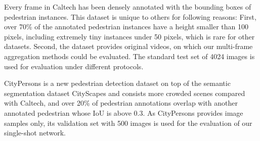 \documentclass[runningheads]{llncs}
\begin{document}
Every frame in Caltech has been densely annotated with the bounding boxes of pedestrian instances. This dataset is unique to others for following reasons: First, over 70\% of the annotated pedestrian instances have a height smaller than 100 pixels, including extremely tiny instances under 50 pixels, which is rare for other datasets. Second, the dataset provides original videos, on which our multi-frame aggregation methods could be evaluated. The standard test set of 4024 images is used for evaluation under different protocols.

CityPersons is a new pedestrian detection dataset on top of the semantic segmentation dataset CityScapes \cite{CityScapes} and consists more crowded scenes compared with Caltech, and over 20\% of pedestrian annotations overlap with another annotated pedestrian whose IoU is above 0.3. As CityPersons provides image samples only, its validation set with 500 images is used for the evaluation of our single-shot network.
\end{document}
